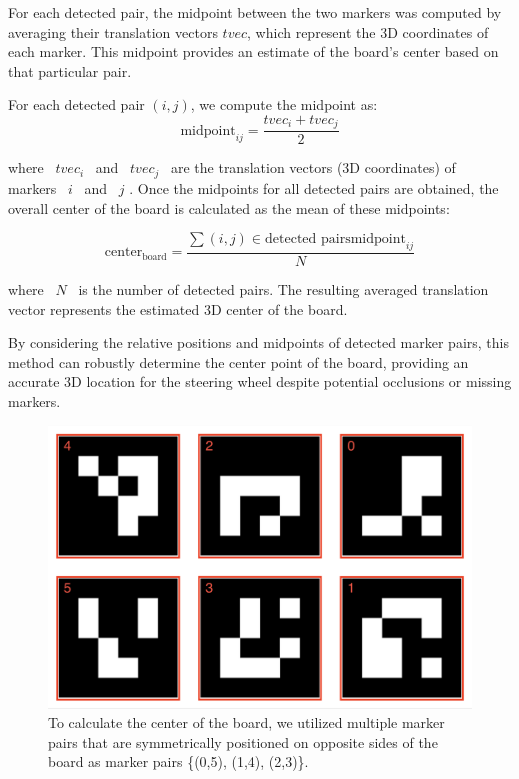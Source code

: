 For each detected pair, the midpoint between the two markers was 
computed by averaging their translation vectors \( tvec \), which 
represent the 3D coordinates of each marker. This midpoint provides an 
estimate of the board’s center based on that particular pair.

For each detected pair \((i, j)\), we compute the midpoint as:
\[
\text{midpoint}_{ij} = \frac{tvec_i + tvec_j}{2}
\]

where  \(tvec_i\)  and  \(tvec_j\)  are the translation vectors 
(3D coordinates) of markers  \(i\)  and  \(j\) . Once the midpoints for 
all detected pairs are obtained, the overall center of the board is 
calculated as the mean of these midpoints:

\[
\text{center}_\text{board} = \frac{\sum{(i, j) \in \text{detected pairs}} \text{midpoint}_{ij}}{N}
\]

where  \(N\)  is the number of detected pairs. The resulting averaged 
translation vector represents the estimated 3D center of the board. 


By considering the relative positions and midpoints of detected marker 
pairs, this method can robustly determine the center point of the board, 
providing an accurate 3D location for the steering wheel despite 
potential occlusions or missing markers.

\begin{figure}[ht]
    \centering
    \includegraphics[scale=0.5]{media/chapter 5/aruco_board_ids.png}
    \caption{To calculate the center of the board, we utilized multiple 
    marker pairs that are symmetrically positioned on opposite sides of 
    the board as marker pairs \{(0,5), (1,4), (2,3)\}.}
    \label{fig:marker_ids}
\end{figure}


